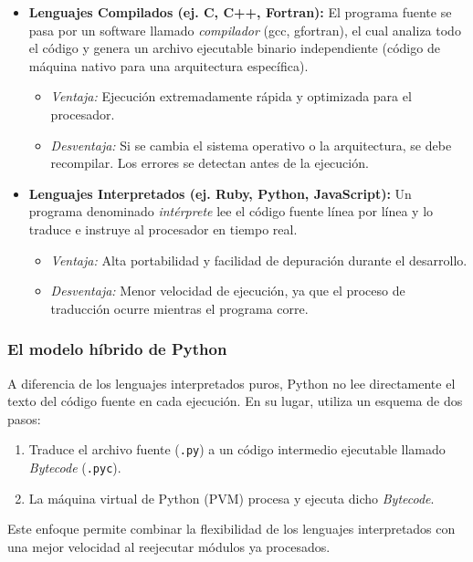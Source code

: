 \documentclass[12pt]{article}
\begin{document}
  \begin{itemize}
    \item \textbf{Lenguajes Compilados (ej. C, C++, Fortran):} 
    El programa fuente se pasa por un software llamado \textit{compilador} (gcc, gfortran), 
    el cual analiza todo el código y genera un archivo ejecutable binario 
    independiente (código de máquina nativo para una arquitectura específica). 
    \begin{itemize}
        \item \textit{Ventaja:} Ejecución extremadamente rápida y optimizada para el procesador.
        \item \textit{Desventaja:} Si se cambia el sistema operativo o la arquitectura, 
        se debe recompilar. Los errores se detectan antes de la ejecución.
    \end{itemize}

    \item \textbf{Lenguajes Interpretados (ej. Ruby, Python, JavaScript):} 
    Un programa denominado \textit{intérprete} lee el código fuente línea por línea y lo traduce e instruye 
    al procesador en tiempo real.
    \begin{itemize}
        \item \textit{Ventaja:} Alta portabilidad y facilidad de depuración durante el desarrollo.
        \item \textit{Desventaja:} Menor velocidad de ejecución, ya que el proceso de traducción ocurre 
        mientras el programa corre.
    \end{itemize}
\end{itemize}

\subsubsection*{El modelo híbrido de Python}
A diferencia de los lenguajes interpretados puros, Python no lee directamente el texto del código fuente 
en cada ejecución. En su lugar, utiliza un esquema de dos pasos:
\begin{enumerate}
    \item Traduce el archivo fuente (\texttt{.py}) a un código intermedio ejecutable 
    llamado \textit{Bytecode} (\texttt{.pyc}).
    \item La máquina virtual de Python (PVM) procesa y ejecuta dicho \textit{Bytecode}.
\end{enumerate}
Este enfoque permite combinar la flexibilidad de los lenguajes interpretados con una mejor
velocidad al reejecutar módulos ya procesados.
\end{document}
